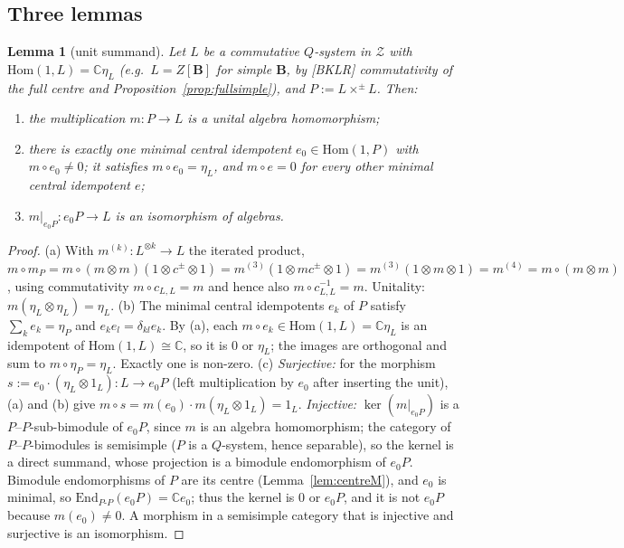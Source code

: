 \documentclass[11pt]{article}
\newtheorem{lemma}[theorem]{Lemma}
\theoremstyle{definition}
\theoremstyle{remark}
\newcommand{\bfB}{\mathbf B}
\begin{document}
\subsection{Three lemmas}

\begin{lemma}[unit summand]\label{lem:unit}
Let $L$ be a commutative $Q$-system in $\mathcal Z$ with $\mathrm{Hom}(1,L)=\mathbb C\eta_L$ (e.g.\ $L=Z[\bfB]$ for simple $\bfB$, by [BKLR] commutativity of the full centre and Proposition~\ref{prop:fullsimple}), and $P:=L\times^\pm L$. Then:
\begin{enumerate}[nosep,label=(\alph*)]
\item the multiplication $m\colon P\to L$ is a unital algebra homomorphism;
\item there is exactly one minimal central idempotent $e_0\in\mathrm{Hom}(1,P)$ with $m\circ e_0\neq0$; it satisfies $m\circ e_0=\eta_L$, and $m\circ e=0$ for every other minimal central idempotent $e$;
\item $m|_{e_0P}\colon e_0P\to L$ is an isomorphism of algebras.
\end{enumerate}
\end{lemma}
\begin{proof}
(a) With $m^{(k)}\colon L^{\otimes k}\to L$ the iterated product, $m\circ m_P=m\circ(m\otimes m)(1\otimes c^{\pm}\otimes1)=m^{(3)}(1\otimes m c^\pm\otimes1)=m^{(3)}(1\otimes m\otimes1)=m^{(4)}=m\circ(m\otimes m)$, using commutativity $m\circ c_{L,L}=m$ and hence also $m\circ c_{L,L}^{-1}=m$. Unitality: $m(\eta_L\otimes\eta_L)=\eta_L$.
(b) The minimal central idempotents $e_k$ of $P$ satisfy $\sum_ke_k=\eta_P$ and $e_ke_l=\delta_{kl}e_k$. By (a), each $m\circ e_k\in\mathrm{Hom}(1,L)=\mathbb C\eta_L$ is an idempotent of $\mathrm{Hom}(1,L)\cong\mathbb C$, so it is $0$ or $\eta_L$; the images are orthogonal and sum to $m\circ\eta_P=\eta_L$. Exactly one is non-zero.
(c) \emph{Surjective:} for the morphism $s:=e_0\cdot(\eta_L\otimes1_L)\colon L\to e_0P$ (left multiplication by $e_0$ after inserting the unit), (a) and (b) give $m\circ s=m(e_0)\cdot m(\eta_L\otimes1_L)=1_L$. \emph{Injective:} $\ker(m|_{e_0P})$ is a $P$--$P$-sub-bimodule of $e_0P$, since $m$ is an algebra homomorphism; the category of $P$--$P$-bimodules is semisimple ($P$ is a $Q$-system, hence separable), so the kernel is a direct summand, whose projection is a bimodule endomorphism of $e_0P$. Bimodule endomorphisms of $P$ are its centre (Lemma~\ref{lem:centreM}), and $e_0$ is minimal, so $\mathrm{End}_{P\text{-}P}(e_0P)=\mathbb Ce_0$; thus the kernel is $0$ or $e_0P$, and it is not $e_0P$ because $m(e_0)\ne0$. A morphism in a semisimple category that is injective and surjective is an isomorphism.
\end{proof}
\end{document}
